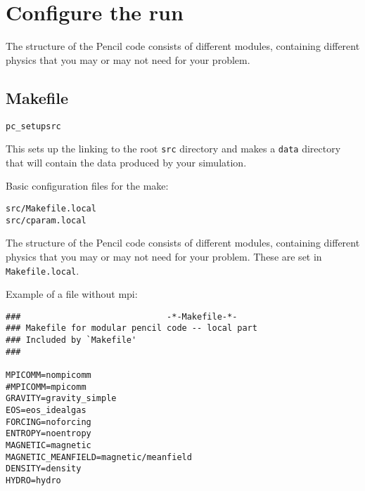 \documentclass[a4paper,12pt]{article}
\begin{document}

\section{Configure the run}
The structure of the Pencil code consists of different modules, containing
different physics that you may or may not need for your problem. 

\subsection{Makefile}

\begin{verbatim}
pc_setupsrc
\end{verbatim}
This sets up the linking to the root \verb|src| directory and makes a
\verb|data| directory that will contain the data produced by your simulation.

Basic configuration files for the make:
\begin{verbatim}
src/Makefile.local
src/cparam.local
\end{verbatim}

The structure of the Pencil code consists of different modules, containing
different physics that you may or may not need for your problem. These are set
in \verb|Makefile.local|. 

Example of a file without mpi:
\begin{verbatim}
###                             -*-Makefile-*-
### Makefile for modular pencil code -- local part
### Included by `Makefile'
###

MPICOMM=nompicomm
#MPICOMM=mpicomm
GRAVITY=gravity_simple
EOS=eos_idealgas
FORCING=noforcing
ENTROPY=noentropy
MAGNETIC=magnetic
MAGNETIC_MEANFIELD=magnetic/meanfield
DENSITY=density
HYDRO=hydro
\end{verbatim}
\end{document}
